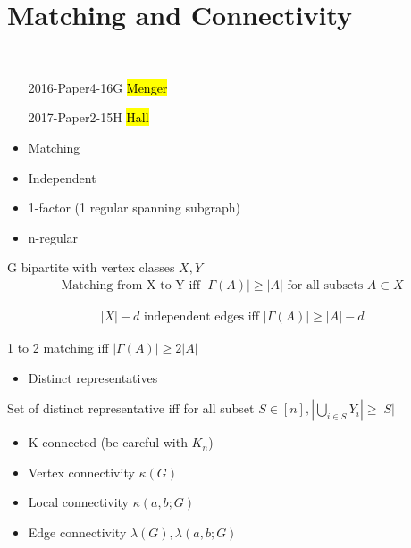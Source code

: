 \section{Matching and Connectivity}\label{sec:matching-and-connectivity}

\begin{exam}
    \,
    \begin{enumerate}
        \item[2016-Paper4-16G] \hl{Menger}
        \item[2017-Paper2-15H] \hl{Hall}
    \end{enumerate}
\end{exam}

\begin{itemize}
    \item Matching
    \item Independent
    \item 1-factor (1 regular spanning subgraph)
    \item n-regular
\end{itemize}

\begin{thm}[Hall]
    G bipartite with vertex classes $X, Y$
    \begin{align*}
        \text{Matching from X to Y iff $|\Gamma(A)| \geq |A|$ for all subsets $A \subset X$}
    \end{align*}
\end{thm}

\begin{thm}
    \begin{align*}
        |X| - d \text{ independent edges iff } |\Gamma(A)| \geq |A| - d
    \end{align*}
\end{thm}

\begin{thm}
    1 to 2 matching iff $|\Gamma(A)| \geq 2|A|$
\end{thm}

\begin{itemize}
    \item Distinct representatives
\end{itemize}

\begin{cor}
    Set of distinct representative iff for all subset $S \in [n], |\bigcup_{i \in S}{Y_i}| \geq |S|$
\end{cor}

\begin{itemize}
    \item K-connected (be careful with $K_n$)
    \item Vertex connectivity $\kappa (G)$
    \item Local connectivity $\kappa(a, b; G)$
    \item Edge connectivity $\lambda(G), \lambda(a, b; G)$
\end{itemize}

